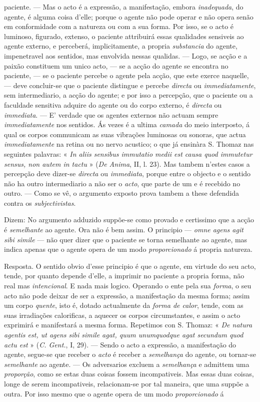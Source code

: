 paciente. --- Mas o acto é a expressão, a manifestação, embora \emph{inadequada}, do agente, é alguma coisa d'elle; porque o agente não pode operar e não opera senão em conformidade com a natureza ou com a sua forma. Por isso, se o acto é luminoso, figurado, extenso, o paciente attribuirá essas qualidades sensiveis ao agente externo, e perceberá, implicitamente, a propria \emph{substancia} do agente, impenetravel aos sentidos, mas envolvida nessas qualidas. --- Logo, se acção e a paixão constituem um unico acto, --- se a acção do agente se encontra no paciente, --- se o paciente percebe o agente pela acção, que este exerce naquelle, --- deve concluir-se que o paciente distingue e percebe \emph{directa} ou \emph{immediatamente}, sem intermediario, a acção do agente; e por isso a percepção, que o paciente ou a faculdade sensitiva adquire do agente ou do corpo externo, é \emph{directa} ou \emph{immediata}. --- E' verdade que os agentes externos não actuam sempre \emph{immediatamente} nos sentidos. Ás vezes é a ultima \emph{camada} do meio interposto, á qual os corpos communicam as suas vibrações luminosas ou sonoras, que actua \emph{immediatamente} na retina ou no nervo acustico; o que já ensinàra S. Thomaz nas seguintes palavras: « \emph{In aliis sensibus immutatio medii est causa quod immutetur sensus, non autem in tactu} » (\emph{De Anima}, II, l. 23). Mas tambem n'estes casos a percepção deve dizer-se \emph{directa} ou \emph{immediata}, porque entre o objecto e o sentido não ha outro intermediario a não ser o \emph{acto}, que parte de um e é recebido no outro. --- Como se vê, o argumento exposto prova tambem a these defendida contra os \emph{subjectivistas}.\par Dizem: No argumento adduzido suppõe-se como provado e certissimo que a acção é \emph{semelhante} ao agente. Ora não é bem assim. O principio --- \emph{omne agens agit sibi simile} --- não quer dizer que o paciente se torna semelhante ao agente, mas indica apenas que o agente opera de um modo \emph{proporcionado} á propria natureza.\par Resposta. O sentido obvio d'esse principio é que o agente, em virtude do seu acto, tende, por quanto depende d'elle, a imprimir no paciente a propria forma, não real mas \emph{intencional}. E nada mais logico. Operando o ente pela sua \emph{forma}, o seu acto não pode deixar de ser a expressão, a manifestação da mesma forma; assim um corpo \emph{quente}, isto é, dotado actualmente da \emph{forma de calor}, tende, com as suas irradiações calorificas, a aquecer os corpos circumstantes, e assim o acto exprimirá e manifestará a mesma forma. Repetimos con S. Thomaz: « \emph{De natura agentis est, ut agens sibi simile agat, quum unumquodque agat secundum quod actu est} » (\emph{C. Gent.}, I, 29). --- Sendo o acto a expressão, a manifestação do agente, segue-se que receber o \emph{acto} é receber a \emph{semelhança} do agente, ou tornar-se \emph{semelhante} ao agente. --- Os adversarios excluem a \emph{semelhança} e admittem uma \emph{proporção}, como se estas duas coisas fossem incompativeis. Mas essas duas coisas, longe de serem incompativeis, relacionam-se por tal maneira, que uma suppõe a outra. Por isso mesmo que o agente opera de um modo \emph{proporcionado} á 